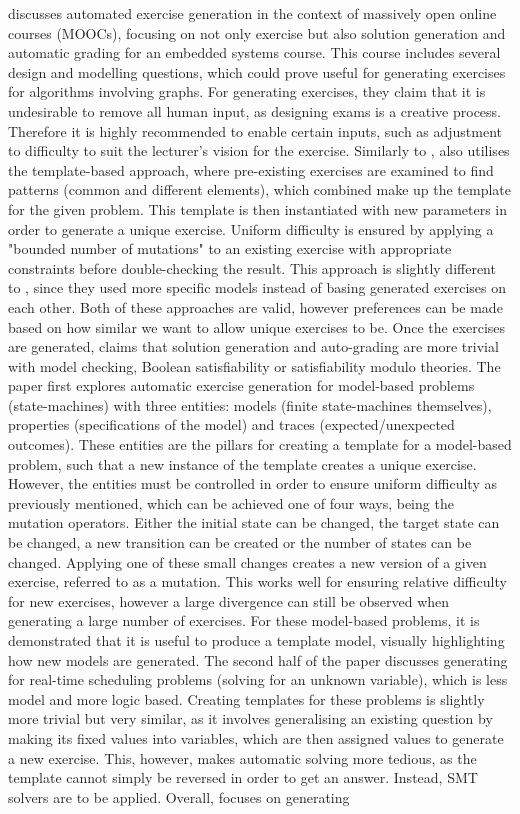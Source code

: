\documentclass{l4proj}
\begin{document}
\citet{Sad12} discusses automated exercise generation in the context of massively open online courses (MOOCs), focusing on not only exercise but also solution generation and automatic grading for an embedded systems course. This course includes several design and modelling questions, which could prove useful for generating exercises for algorithms involving graphs. For generating exercises, they claim that it is undesirable to remove all human input, as designing exams is a creative process. Therefore it is highly recommended to enable certain inputs, such as adjustment to difficulty to suit the lecturer's vision for the exercise. Similarly to \citet{Hoz21}, \citet{Sad12} also utilises the template-based approach, where pre-existing exercises are examined to find patterns (common and different elements), which combined make up the template for the given problem. This template is then instantiated with new parameters in order to generate a unique exercise. Uniform difficulty is ensured by applying a "bounded number of mutations" to an existing exercise with appropriate constraints before double-checking the result. This approach is slightly different to \citet{Hoz21}, since they used more specific models instead of basing generated exercises on each other. Both of these approaches are valid, however preferences can be made based on how similar we want to allow unique exercises to be. Once the exercises are generated, \citet{Sad12} claims that solution generation and auto-grading are more trivial with model checking, Boolean satisfiability or satisfiability modulo theories. The paper first explores automatic exercise generation for model-based problems (state-machines) with three entities: models (finite state-machines themselves), properties (specifications of the model) and traces (expected/unexpected outcomes). These entities are the pillars for creating a template for a model-based problem, such that a new instance of the template creates a unique exercise. However, the entities must be controlled in order to ensure uniform difficulty as previously mentioned, which can be achieved one of four ways, being the mutation operators. Either the initial state can be changed, the target state can be changed, a new transition can be created or the number of states can be changed. Applying one of these small changes creates a new version of a given exercise, referred to as a mutation. This works well for ensuring relative difficulty for new exercises, however a large divergence can still be observed when generating a large number of exercises. For these model-based problems, it is demonstrated that it is useful to produce a template model, visually highlighting how new models are generated. The second half of the paper discusses generating for real-time scheduling problems (solving for an unknown variable), which is less model and more logic based. Creating templates for these problems is slightly more trivial but very similar, as it involves generalising an existing question by making its fixed values into variables, which are then assigned values to generate a new exercise. This, however, makes automatic solving more tedious, as the template cannot simply be reversed in order to get an answer. Instead, SMT solvers are to be applied. Overall, \citet{Sad12} focuses on generating 
\end{document}
